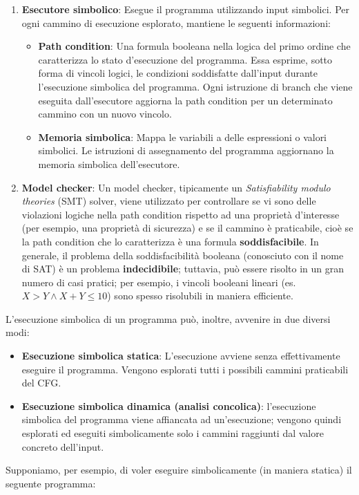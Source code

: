 \documentclass[../main.tex]{subfiles}
\begin{document}
\begin{enumerate}
    \item \textbf{Esecutore simbolico}: Esegue il programma utilizzando input simbolici. Per ogni cammino di esecuzione esplorato, mantiene le seguenti informazioni:
    \begin{itemize}
        \item \textbf{Path condition}: Una formula booleana nella logica del primo ordine che caratterizza lo stato d'esecuzione del programma. Essa esprime, sotto forma di vincoli logici, le condizioni soddisfatte dall'input durante l'esecuzione simbolica del programma.
        Ogni istruzione di branch che viene eseguita dall'esecutore aggiorna la path condition per un determinato cammino con un nuovo vincolo. 
        \item \textbf{Memoria simbolica}: Mappa le variabili a delle espressioni o valori simbolici. Le istruzioni di assegnamento del programma aggiornano la memoria simbolica dell'esecutore.
    \end{itemize}
    \item \textbf{Model checker}: Un model checker, tipicamente un \textit{Satisfiability modulo theories} (SMT) solver, viene utilizzato per controllare se vi sono delle violazioni logiche nella path condition rispetto ad una proprietà d'interesse (per esempio, una proprietà di sicurezza) e se il cammino è praticabile, cioè se la path condition che
    lo caratterizza è una formula \textbf{soddisfacibile}. In generale, il problema della soddisfacibilità booleana (conosciuto con il nome di SAT) è un problema \textbf{indecidibile}; tuttavia, può essere risolto in un gran numero di casi pratici; per esempio, 
    i vincoli booleani lineari (es. $X > Y \land X + Y \leq 10$) sono spesso risolubili in maniera efficiente.
\end{enumerate}
L'esecuzione simbolica di un programma può, inoltre, avvenire in due diversi modi:
\begin{itemize}
    \item \textbf{Esecuzione simbolica statica}: L'esecuzione avviene senza effettivamente eseguire il programma. Vengono esplorati tutti i possibili cammini praticabili del CFG.
    \item \textbf{Esecuzione simbolica dinamica (analisi concolica)}: l'esecuzione simbolica del programma viene affiancata ad un'esecuzione; vengono quindi esplorati ed eseguiti simbolicamente solo i cammini raggiunti dal valore concreto dell'input.
\end{itemize}
Supponiamo, per esempio, di voler eseguire simbolicamente (in maniera statica) il seguente programma:
\end{document}
